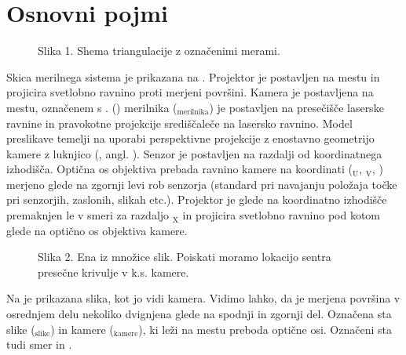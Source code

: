 \documentclass[letterpaper,10pt,english]{sphinxmanual}
\begin{document}
\section{Osnovni pojmi}
\label{\detokenize{laserskiprofilomer:osnovni-pojmi}}
\begin{figure}[htbp]
\centering
\capstart

\noindent{}
\caption{Slika 1. Shema triangulacije z označenimi merami.}\label{\detokenize{laserskiprofilomer:id1}}\end{figure}

\sphinxAtStartPar
Skica merilnega sistema je prikazana na . Projektor je postavljen na mestu  in projicira svetlobno
ravnino proti merjeni površini. Kamera je postavljena na mestu, označenem s .  () merilnika ($_{\text{merilnika}}$) je postavljen na presečišče laserske ravnine in pravokotne projekcije središčaleče na lasersko ravnino. Model preslikave temelji na uporabi perspektivne projekcije z enostavno
geometrijo kamere z luknjico (, angl. ). Senzor je postavljen na razdalji
 od koordinatnega izhodišča. Optična os objektiva prebada ravnino kamere na koordinati ($_{\text{U}}$, $_{\text{V}}$, )
merjeno glede na zgornji levi rob senzorja (standard pri navajanju položaja točke pri senzorjih, zaslonih,
slikah etc.). Projektor je glede na koordinatno izhodišče premaknjen le v  smeri za razdaljo $_{\text{X}}$ in
projicira svetlobno ravnino pod kotom  glede na optično os objektiva kamere.

\begin{figure}[htbp]
\centering
\capstart

\noindent{}
\caption{Slika 2. Ena iz množice slik. Poiskati moramo lokacijo sentra presečne krivulje v k.s. kamere.}\label{\detokenize{laserskiprofilomer:id2}}\end{figure}

\sphinxAtStartPar
Na  je prikazana slika, kot jo vidi kamera. Vidimo lahko, da je merjena površina v osrednjem delu
nekoliko dvignjena glede na spodnji in zgornji del. Označena sta  slike ($_{\text{slike}}$) in  kamere
($_{\text{kamere}}$), ki leži na mestu preboda optične osi. Označeni sta tudi smer  in .
\end{document}

